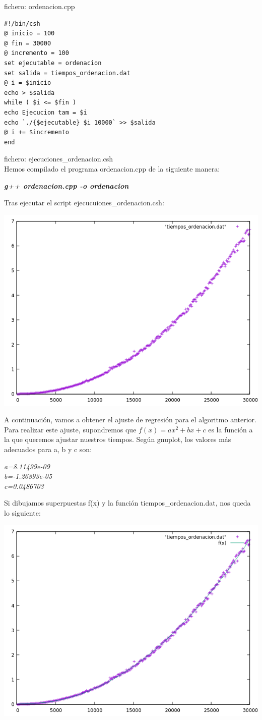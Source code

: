 \documentclass[a4paper,11pt]{article}
\begin{document}
{\tiny fichero: ordenacion.cpp}
\lstset{language=Bash, breaklines=true, basicstyle=\footnotesize}
\begin{lstlisting}[frame=single]
#!/bin/csh
@ inicio = 100
@ fin = 30000
@ incremento = 100
set ejecutable = ordenacion
set salida = tiempos_ordenacion.dat
@ i = $inicio
echo > $salida
while ( $i <= $fin )
echo Ejecucion tam = $i
echo `./{$ejecutable} $i 10000` >> $salida
@ i += $incremento
end
\end{lstlisting}
{\tiny fichero: ejecuciones\_ordenacion.csh} \\
Hemos compilado el programa ordenacion.cpp de la siguiente manera:
\begin{center}
{\bf \it g++ ordenacion.cpp -o ordenacion}
\end{center}
Tras ejecutar el script ejecucuiones\_ordenacion.csh: 
\begin{center}
\includegraphics[scale=0.5]{1}
\end{center}
A continuación, vamos a obtener el ajuste de regresión para el algoritmo anterior. Para realizar este ajuste, supondremos que $f(x)=ax^2+bx+c$ es la función a la que queremos ajustar nuestros tiempos. Según gnuplot, los valores más adecuados para a, b y c son:
\begin{center}
{\it a=8.11499e-09 \\ b=-1.26893e-05 \\ c=0.0486703}
\end{center}
Si dibujamos superpuestas f(x) y la función tiempos\_ordenacion.dat, nos queda lo siguiente:
\begin{center}
\includegraphics[scale=0.5]{2}
\end{center}


\nocite{*}
\end{document}
